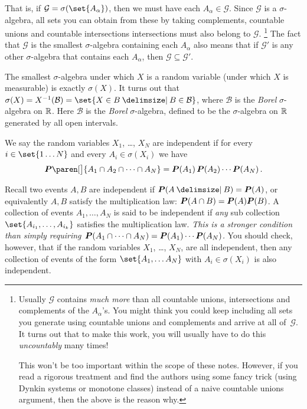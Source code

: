 That is, if $\mathcal G = \sigma(\set{A_\alpha})$, then we must have each $A_\alpha \in \mathcal G$.
Since $\mathcal G$ is a $\sigma$-algebra, all sets you can obtain from these by taking complements, countable unions and countable intersections intersections must also belong to $\mathcal G$.%
\footnote{
  Usually $\mathcal G$ contains \emph{much more} than all countable unions, intersections and complements of the $A_\alpha$'s.
  You might think you could keep including all sets you generate using countable unions and complements and arrive at all of~$\mathcal G$.
  It turns out that to make this work, you will usually have to do this \emph{uncountably} many times!

  This won't be too important within the scope of these notes.
  However, if you read a rigorous treatment and find the authors using some fancy trick (using Dynkin systems or monotone classes) instead of a naive countable unions argument, then the above is the reason why.
}
The fact that $\mathcal G$ is the smallest $\sigma$-algebra containing each $A_\alpha$ also means that if $\mathcal G'$ is any other $\sigma$-algebra that contains each $A_\alpha$, then $\mathcal G \subseteq \mathcal G'$.


\begin{remark}
  The smallest $\sigma$-algebra under which $X$ is a random variable (under which $X$ is measurable) is exactly $\sigma(X)$.
  It turns out that $\sigma(X) = X^{-1}(\mathcal B) =  \set{X \in B \st B \in \mathcal B}$, where $\mathcal B$ is the \emph{Borel} $\sigma$-algebra on $\R$.
  Here $\mathcal B$ is the \emph{Borel} $\sigma$-algebra, defined to be the $\sigma$-algebra on $\R$ generated by all open intervals.
\end{remark}
\iffalse
\begin{definition}
  We say two random variables $X$ and $Y$ are independent if for every $A \in \sigma(X)$ and $B \in \sigma(Y)$, the events $A$ and $B$ are independent (i.e.\ $\P(A \cap B) = P(A) P(B)$, or $P(A \given B) = P(A)$).
\end{definition}
\fi
\begin{definition}
  We say the random variables $X_1$, \dots, $X_N$ are independent if for every $i \in \set{1 \dots N}$ and every $A_i \in \sigma(X_i)$ we have
  \begin{equation*}
    \P\paren[\big]{ A_1 \cap A_2 \cap \cdots \cap A_N } = \P(A_1) \, \P(A_2) \cdots \P(A_N) \, .
  \end{equation*}
\end{definition}
\begin{remark}
  Recall two events $A, B$ are independent if $\P(A \given B) = \P(A)$, or equivalently $A, B$ satisfy the multiplication law: $\P(A \cap B) = \P(A) \P(B)$.
  A collection of events $A_1, \dots, A_N$ is said to be independent if \emph{any} sub collection $\set{A_{i_1}, \dots, A_{i_k}}$ satisfies the multiplication law.
  \emph{This is a stronger condition than simply requiring $\P(A_1 \cap \cdots \cap A_N) = \P(A_1) \cdots \P(A_N)$.}
  You should check, however, that if the random variables $X_1$, \dots, $X_N$, are all independent, then any collection of events of the form $\set{A_1, \dots A_N}$ with $A_i \in \sigma(X_i)$ is also independent.
\end{remark}

